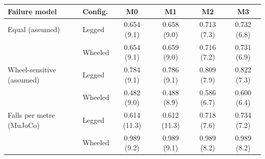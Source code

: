 \begin{tabular}{@{}llcccc@{}}
\toprule
Failure model & Config. & M0 & M1 & M2 & M3 \\ \midrule
Equal (assumed) & Legged & 0.654 (9.1) & 0.658 (9.0) & 0.713 (7.3) & 0.732 (6.8) \\
 & Wheeled & 0.654 (9.1) & 0.659 (9.0) & 0.716 (7.2) & 0.731 (6.9) \\
Wheel-sensitive (assumed) & Legged & 0.784 (9.1) & 0.786 (9.1) & 0.809 (7.9) & 0.822 (7.3) \\
 & Wheeled & 0.482 (9.0) & 0.488 (8.9) & 0.586 (6.7) & 0.600 (6.4) \\
Falls per metre (MuJoCo) & Legged & 0.614 (11.3) & 0.612 (11.3) & 0.718 (7.6) & 0.734 (7.2) \\
 & Wheeled & 0.989 (9.2) & 0.989 (9.1) & 0.989 (8.2) & 0.989 (8.2) \\
\bottomrule
\end{tabular}
